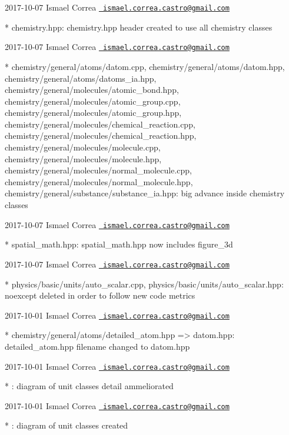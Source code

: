  2017-\/10-\/07 Ismael Correa \href{mailto:ismael.correa.castro@gmail.com}{\texttt{ ismael.\+correa.\+castro@gmail.\+com}} \begin{DoxyVerb}* chemistry.hpp: chemistry.hpp header created to use all chemistry
classes
\end{DoxyVerb}
 2017-\/10-\/07 Ismael Correa \href{mailto:ismael.correa.castro@gmail.com}{\texttt{ ismael.\+correa.\+castro@gmail.\+com}} \begin{DoxyVerb}* chemistry/general/atoms/datom.cpp,
chemistry/general/atoms/datom.hpp,
chemistry/general/atoms/datoms_ia.hpp,
chemistry/general/molecules/atomic_bond.hpp,
chemistry/general/molecules/atomic_group.cpp,
chemistry/general/molecules/atomic_group.hpp,
chemistry/general/molecules/chemical_reaction.cpp,
chemistry/general/molecules/chemical_reaction.hpp,
chemistry/general/molecules/molecule.cpp,
chemistry/general/molecules/molecule.hpp,
chemistry/general/molecules/normal_molecule.cpp,
chemistry/general/molecules/normal_molecule.hpp,
chemistry/general/substance/substance_ia.hpp: big advance inside
chemistry classes
\end{DoxyVerb}
 2017-\/10-\/07 Ismael Correa \href{mailto:ismael.correa.castro@gmail.com}{\texttt{ ismael.\+correa.\+castro@gmail.\+com}} \begin{DoxyVerb}* spatial_math.hpp: spatial_math.hpp now includes figure_3d
\end{DoxyVerb}
 2017-\/10-\/07 Ismael Correa \href{mailto:ismael.correa.castro@gmail.com}{\texttt{ ismael.\+correa.\+castro@gmail.\+com}} \begin{DoxyVerb}* physics/basic/units/auto_scalar.cpp,
physics/basic/units/auto_scalar.hpp: noexcept deleted in order to
follow new code metrics
\end{DoxyVerb}
 2017-\/10-\/01 Ismael Correa \href{mailto:ismael.correa.castro@gmail.com}{\texttt{ ismael.\+correa.\+castro@gmail.\+com}} \begin{DoxyVerb}* chemistry/general/atoms/{detailed_atom.hpp => datom.hpp}: 
detailed_atom.hpp filename changed to datom.hpp
\end{DoxyVerb}
 2017-\/10-\/01 Ismael Correa \href{mailto:ismael.correa.castro@gmail.com}{\texttt{ ismael.\+correa.\+castro@gmail.\+com}} \begin{DoxyVerb}* : diagram of unit classes detail ammeliorated
\end{DoxyVerb}
 2017-\/10-\/01 Ismael Correa \href{mailto:ismael.correa.castro@gmail.com}{\texttt{ ismael.\+correa.\+castro@gmail.\+com}} \begin{DoxyVerb}* : diagram of unit classes created
\end{DoxyVerb}
